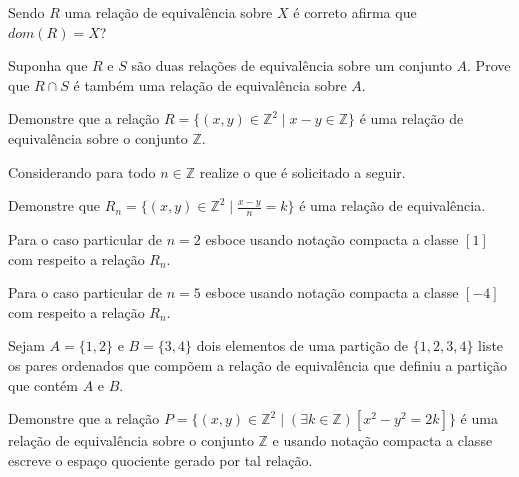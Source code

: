 \begin{questao}\label{test:EquivalenciaOrdem6}
	Sendo $R$ uma relação de equivalência sobre $X$ é correto afirma que $dom(R) = X$?
\end{questao}

\begin{questao}\label{test:EquivalenciaOrdem7}
	Suponha que  $R$ e $S$ são duas relações de equivalência sobre um conjunto $A$. Prove que $R \cap S$ é também uma relação de equivalência sobre $A$.
\end{questao}

\begin{questao}\label{test:EquivalenciaOrdem8}
	Demonstre que a relação $R = \{(x, y) \in \mathbb{Z}^2 \mid x - y \in \mathbb{Z} \}$ é uma relação de equivalência sobre o conjunto $\mathbb{Z}$.
\end{questao}

\begin{questao}\label{test:EquivalenciaOrdem9}
	Considerando para todo $n \in \mathbb{Z}$ realize o que é solicitado a seguir.
\end{questao}

\begin{exerList}
	\item Demonstre que $R_n = \{(x, y) \in \mathbb{Z}^2 \mid \displaystyle\frac{x - y}{n} = k\}$ é uma relação de equivalência.
	\item Para o caso particular de $n = 2$ esboce usando notação compacta a classe $[1]$ com respeito a relação $R_n$.
	\item Para o caso particular de $n = 5$ esboce usando notação compacta a classe $[-4]$ com respeito a relação $R_n$.
\end{exerList}

\begin{questao}\label{test:EquivalenciaOrdem10}
	Sejam $A = \{1, 2\}$ e $B = \{3, 4\}$ dois elementos de uma partição de $\{1, 2, 3, 4\}$ liste os pares ordenados que compõem a relação de equivalência que definiu a partição que contém $A$ e $B$.
\end{questao}

\begin{questao}\label{test:EquivalenciaOrdem11}
	Demonstre que a relação $P = \{(x, y) \in \mathbb{Z}^2 \mid (\exists k \in \mathbb{Z})[x^2 - y^2 = 2k]\}$ é uma relação de equivalência sobre o conjunto $\mathbb{Z}$ e usando notação compacta a classe escreve o espaço quociente gerado por tal relação.
\end{questao}

